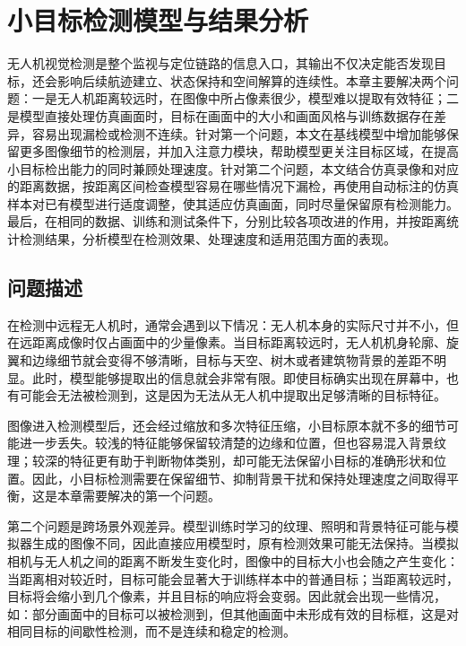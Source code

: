 \chapter{小目标检测模型与结果分析}
\label{chap:detection}

无人机视觉检测是整个监视与定位链路的信息入口，其输出不仅决定能否发现目标，还会影响后续航迹建立、状态保持和空间解算的连续性。本章主要解决两个问题：一是无人机距离较远时，在图像中所占像素很少，模型难以提取有效特征；二是模型直接处理仿真画面时，目标在画面中的大小和画面风格与训练数据存在差异，容易出现漏检或检测不连续。针对第一个问题，本文在基线模型中增加能够保留更多图像细节的检测层，并加入注意力模块，帮助模型更关注目标区域，在提高小目标检出能力的同时兼顾处理速度。针对第二个问题，本文结合仿真录像和对应的距离数据，按距离区间检查模型容易在哪些情况下漏检，再使用自动标注的仿真样本对已有模型进行适度调整，使其适应仿真画面，同时尽量保留原有检测能力。最后，在相同的数据、训练和测试条件下，分别比较各项改进的作用，并按距离统计检测结果，分析模型在检测效果、处理速度和适用范围方面的表现。

\section{问题描述}
\label{sec:ch5_problem}

在检测中远程无人机时，通常会遇到以下情况：无人机本身的实际尺寸并不小，但在远距离成像时仅占画面中的少量像素。当目标距离较远时，无人机机身轮廓、旋翼和边缘细节就会变得不够清晰，目标与天空、树木或者建筑物背景的差距不明显。此时，模型能够提取出的信息就会非常有限。即使目标确实出现在屏幕中，也有可能会无法被检测到，这是因为无法从无人机中提取出足够清晰的目标特征。

图像进入检测模型后，还会经过缩放和多次特征压缩，小目标原本就不多的细节可能进一步丢失。较浅的特征能够保留较清楚的边缘和位置，但也容易混入背景纹理；较深的特征更有助于判断物体类别，却可能无法保留小目标的准确形状和位置。因此，小目标检测需要在保留细节、抑制背景干扰和保持处理速度之间取得平衡，这是本章需要解决的第一个问题。

第二个问题是跨场景外观差异。模型训练时学习的纹理、照明和背景特征可能与模拟器生成的图像不同，因此直接应用模型时，原有检测效果可能无法保持。当模拟相机与无人机之间的距离不断发生变化时，图像中的目标大小也会随之产生变化：当距离相对较近时，目标可能会显著大于训练样本中的普通目标；当距离较远时，目标将会缩小到几个像素，并且目标的响应将会变弱。因此就会出现一些情况，如：部分画面中的目标可以被检测到，但其他画面中未形成有效的目标框，这是对相同目标的间歇性检测，而不是连续和稳定的检测。

